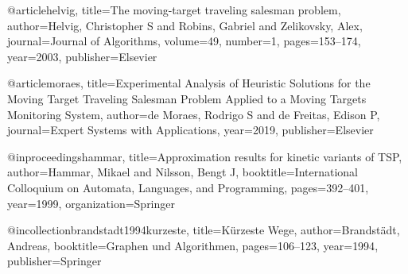 \documentclass[german,version-2019-11]{uzl-thesis}
\begin{document}
\begin{bibtex-entries}
@article{helvig,
  title={The moving-target traveling salesman problem},
  author={Helvig, Christopher S and Robins, Gabriel and Zelikovsky, Alex},
  journal={Journal of Algorithms},
  volume={49},
  number={1},
  pages={153--174},
  year={2003},
  publisher={Elsevier}
}

@article{moraes,
  title={Experimental Analysis of Heuristic Solutions for the Moving Target Traveling Salesman Problem Applied to a Moving Targets Monitoring System},
  author={de Moraes, Rodrigo S and de Freitas, Edison P},
  journal={Expert Systems with Applications},
  year={2019},
  publisher={Elsevier}
}

@inproceedings{hammar,
  title={Approximation results for kinetic variants of TSP},
  author={Hammar, Mikael and Nilsson, Bengt J},
  booktitle={International Colloquium on Automata, Languages, and Programming},
  pages={392--401},
  year={1999},
  organization={Springer}
}

@incollection{brandstadt1994kurzeste,
  title={K{\"u}rzeste Wege},
  author={Brandst{\"a}dt, Andreas},
  booktitle={Graphen und Algorithmen},
  pages={106--123},
  year={1994},
  publisher={Springer}
}
\end{bibtex-entries}



%
%
%
%
\end{document}
